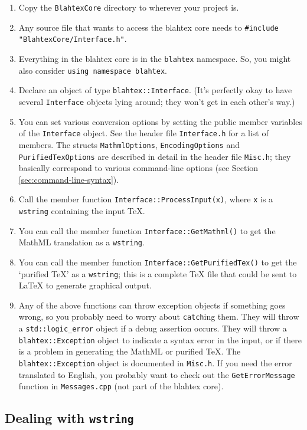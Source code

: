\documentclass{article}
\begin{document}
\begin{enumerate}
\item Copy the \texttt{BlahtexCore} directory to wherever your project is.
\item Any source file that wants to access the blahtex core needs to \texttt{\#include "BlahtexCore/Interface.h"}.
\item Everything in the blahtex core is in the \texttt{blahtex} namespace. So, you might also consider \texttt{using namespace blahtex}.
\item Declare an object of type \texttt{blahtex::Interface}. (It's perfectly okay to have several \texttt{Interface} objects lying around; they won't get in each other's way.)
\item You can set various conversion options by setting the public member variables of the \texttt{Interface} object. See the header file \texttt{Interface.h} for a list of members. The structs \texttt{MathmlOptions}, \texttt{EncodingOptions} and \texttt{PurifiedTexOptions} are described in detail in the header file \texttt{Misc.h}; they basically correspond to various command-line options (see Section \ref{sec:command-line-syntax}).
\item Call the member function \texttt{Interface::ProcessInput(x)}, where \texttt{x} is a \texttt{wstring} containing the input \TeX{}.
\item You can call the member function \texttt{Interface::GetMathml()} to get the MathML translation as a \texttt{wstring}.
\item You can call the member function \texttt{Interface::GetPurifiedTex()} to get the `purified \TeX{}' as a \texttt{wstring}; this is a complete \TeX{} file that could be sent to \LaTeX{} to generate graphical output.
\item Any of the above functions can throw exception objects if something goes wrong, so you probably need to worry about \texttt{catch}ing them. They will throw a \texttt{std::logic\_error} object if a debug assertion occurs. They will throw a \texttt{blahtex::Exception} object to indicate a syntax error in the input, or if there is a problem in generating the MathML or purified \TeX{}. The \texttt{blahtex::Exception} object is documented in \texttt{Misc.h}. If you need the error translated to English, you probably want to check out the \texttt{GetErrorMessage} function in \texttt{Messages.cpp} (not part of the blahtex core).
\end{enumerate}


\subsection{Dealing with \texttt{wstring}}
\end{document}
